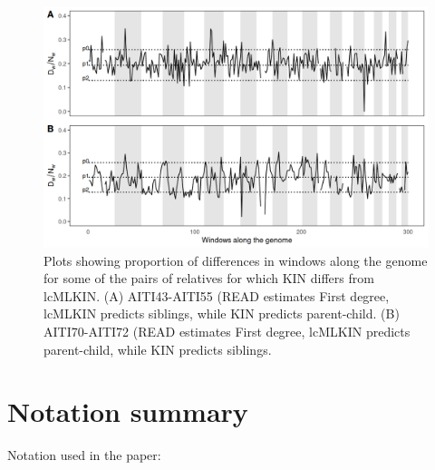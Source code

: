 \documentclass[12pt, letterpaper]{article}
\begin{document}
\begin{figure}[h]
    \centering
    \includegraphics[width=18cm]{supplementary_info/plots/egplot2.png}
    \caption{Plots showing proportion of differences in windows along the genome for some of the pairs of relatives for which KIN differs from lcMLKIN. (A) AITI43-AITI55 (READ estimates First degree, lcMLKIN predicts siblings, while KIN predicts parent-child. (B) AITI70-AITI72 (READ estimates First degree, lcMLKIN predicts parent-child, while KIN predicts siblings.}
    \label{figS9:eg2}
\end{figure}






\section{Notation summary}
Notation used in the paper:
\end{document}
